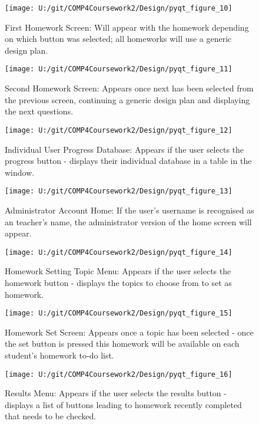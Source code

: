 \begin{figure}[H]
    \label{fig:print_function_result}\caption{First Homework Screen: Will appear with the homework depending on which button was selected; all homeworks will use a generic design plan.}
    \texttt{[image: U:/git/COMP4Coursework2/Design/pyqt\_figure\_10]}
\end{figure}

\begin{figure}[H]
    \label{fig:print_function_result}\caption{Second Homework Screen: Appears once next has been selected from the previous screen, continuing a generic design plan and displaying the next questions.}
    \texttt{[image: U:/git/COMP4Coursework2/Design/pyqt\_figure\_11]}
\end{figure}

\begin{figure}[H]
    \label{fig:print_function_result}\caption{Individual User Progress Database: Appears if the user selects the progress button - displays their individual database in a table in the window.}
    \texttt{[image: U:/git/COMP4Coursework2/Design/pyqt\_figure\_12]}
\end{figure}

\begin{figure}[H]
    \label{fig:print_function_result}\caption{Administrator Account Home: If the user's username is recognised as an teacher's name, the administrator version of the home screen will appear.}
    \texttt{[image: U:/git/COMP4Coursework2/Design/pyqt\_figure\_13]}
\end{figure}

\begin{figure}[H]
    \label{fig:print_function_result}\caption{Homework Setting Topic Menu: Appears if the user selects the homework button - displays the topics to choose from to set as homework.}
    \texttt{[image: U:/git/COMP4Coursework2/Design/pyqt\_figure\_14]}
\end{figure}

\begin{figure}[H]
    \label{fig:print_function_result}\caption{Homework Set Screen: Appears once a topic has been selected - once the set button is pressed this homework will be available on each student's homework to-do list.}
    \texttt{[image: U:/git/COMP4Coursework2/Design/pyqt\_figure\_15]}
\end{figure}

\begin{figure}[H]
    \label{fig:print_function_result}\caption{Results Menu: Appears if the user selects the results button - displays a list of buttons leading to homework recently completed that needs to be checked.}
    \texttt{[image: U:/git/COMP4Coursework2/Design/pyqt\_figure\_16]}
\end{figure}

